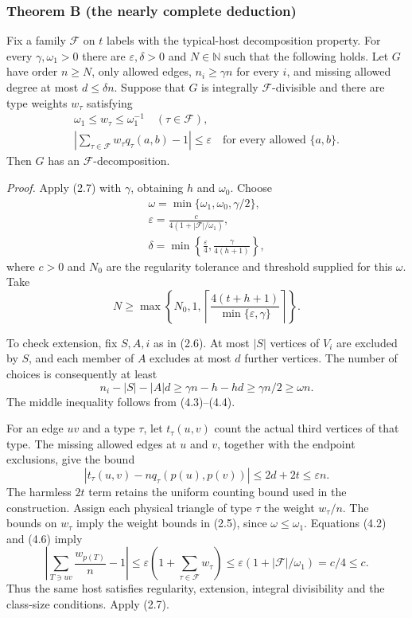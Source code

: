 \documentclass[english,11pt,a4paper]{article}
\begin{document}
\subsubsection{Theorem B (the nearly complete deduction)}\label{theorem-b-the-nearly-complete-deduction}

Fix a family \(\mathcal F\) on \(t\) labels with the typical-host decomposition property. For every \(\gamma,\omega_1>0\) there are \(\varepsilon,\delta>0\) and \(N\in\mathbb N\) such that the following holds. Let \(G\) have order \(n\ge N\), only allowed edges, \(n_i\ge\gamma n\) for every \(i\), and missing allowed degree at most \(d\le\delta n\). Suppose that \(G\) is integrally \(\mathcal F\)-divisible and there are type weights \(w_\tau\) satisfying \[\begin{gathered}
\omega_1\le w_\tau\le\omega_1^{-1}\quad(\tau\in\mathcal F),\\
\left|\sum_{\tau\in\mathcal F}w_\tau q_\tau(a,b)-1\right|\le\varepsilon
\quad\text{for every allowed }\{a,b\}.
\end{gathered}
\tag{4.2}\] Then \(G\) has an \(\mathcal F\)-decomposition.

\emph{Proof.} Apply (2.7) with \(\gamma\), obtaining \(h\) and \(\omega_0\). Choose \[\begin{gathered}
\omega=\min\{\omega_1,\omega_0,\gamma/2\},\\
\varepsilon=\frac{c}{4(1+|\mathcal F|/\omega_1)},\\
\delta=\min\left\{\frac\varepsilon4,\frac\gamma{4(h+1)}\right\},
\end{gathered}
\tag{4.3}\] where \(c>0\) and \(N_0\) are the regularity tolerance and threshold supplied for this \(\omega\). Take \[N\ge\max\left\{N_0,1,
\left\lceil\frac{4(t+h+1)}{\min\{\varepsilon,\gamma\}}\right\rceil\right\}.
\tag{4.4}\]

To check extension, fix \(S,A,i\) as in (2.6). At most \(|S|\) vertices of \(V_i\) are excluded by \(S\), and each member of \(A\) excludes at most \(d\) further vertices. The number of choices is consequently at least \[n_i-|S|-|A|d\ge\gamma n-h-hd\ge\gamma n/2\ge\omega n.
\tag{4.5}\] The middle inequality follows from (4.3)--(4.4).

For an edge \(uv\) and a type \(\tau\), let \(t_\tau(u,v)\) count the actual third vertices of that type. The missing allowed edges at \(u\) and \(v\), together with the endpoint exclusions, give the bound \[|t_\tau(u,v)-nq_\tau(p(u),p(v))|\le2d+2t\le\varepsilon n.
\tag{4.6}\] The harmless \(2t\) term retains the uniform counting bound used in the construction. Assign each physical triangle of type \(\tau\) the weight \(w_\tau/n\). The bounds on \(w_\tau\) imply the weight bounds in (2.5), since \(\omega\le\omega_1\). Equations (4.2) and (4.6) imply \[\left|\sum_{T\ni uv}\frac{w_{p(T)}}n-1\right|
\le\varepsilon\left(1+\sum_{\tau\in\mathcal F}w_\tau\right)
\le\varepsilon(1+|\mathcal F|/\omega_1)=c/4\le c.
\tag{4.7}\] Thus the same host satisfies regularity, extension, integral divisibility and the class-size conditions. Apply (2.7).
\end{document}
